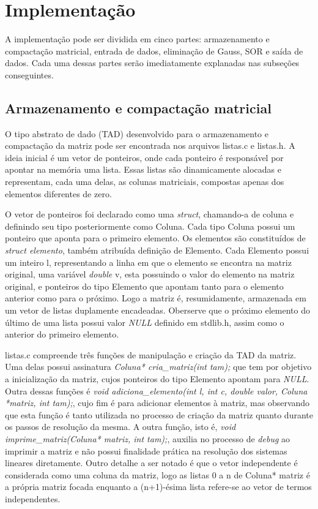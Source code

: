 \documentclass[
	article,			%
	11pt,				%
	oneside,			%
	a4paper,			%
	english,			%
	brazil,				%
	sumario=tradicional
	]{abntex2}
\begin{document}
\section{Implementação}

A implementação pode ser dividida em cinco partes: armazenamento e compactação matricial, entrada de dados, eliminação de Gauss, SOR e saída de dados. Cada uma dessas partes serão imediatamente explanadas nas subseções conseguintes.

\subsection{Armazenamento e compactação matricial}

O tipo abstrato de dado (TAD) desenvolvido para o armazenamento e compactação da matriz pode ser encontrada nos arquivos listas.c e listas.h. A ideia inicial é um vetor de ponteiros, onde cada ponteiro é responsável por apontar na memória uma lista. Essas listas são dinamicamente alocadas e representam, cada uma delas, as colunas matriciais, compostas apenas dos elementos diferentes de zero.

O vetor de ponteiros foi declarado como uma \emph{struct}, chamando-a de coluna e definindo seu tipo posteriormente como Coluna. Cada tipo Coluna possui um ponteiro que aponta para o primeiro elemento. Os elementos são constituídos de \emph{struct elemento}, também atribuída definição de Elemento. Cada Elemento possui um inteiro l, representando a linha em que o elemento se encontra na matriz original, uma variável \emph{double} v, esta possuindo o valor do elemento na matriz original, e ponteiros do tipo Elemento que apontam tanto para o elemento anterior como para o próximo. Logo a matriz é, resumidamente, armazenada em um vetor de listas duplamente encadeadas. Oberserve que o próximo elemento do último de uma lista possui valor \emph{NULL} definido em stdlib.h, assim como o anterior do primeiro elemento.

listas.c compreende três funções de manipulação e criação da TAD da matriz. Uma delas possui assinatura \emph{Coluna* cria\_matriz(int tam);} que tem por objetivo a inicialização da matriz, cujos ponteiros do tipo Elemento apontam para \emph{NULL}. Outra dessas funções é \emph{void adiciona\_elemento(int l, int c, double valor, Coluna *matriz, int tam);}, cujo fim é para adicionar elementos à matriz, mas observando que esta função é tanto utilizada no processo de criação da matriz quanto durante os passos de resolução da mesma. A outra função, isto é, \emph{void imprime\_matriz(Coluna* matriz, int tam);}, auxilia no processo de \emph{debug} ao imprimir a matriz e não possui finalidade prática na resolução dos sistemas lineares diretamente. Outro detalhe a ser notado é que o vetor independente é considerada como uma coluna da matriz, logo as listas 0 a n de Coluna* matriz é a própria matriz focada enquanto a (n+1)-ésima lista refere-se ao vetor de termos independentes.
\end{document}
